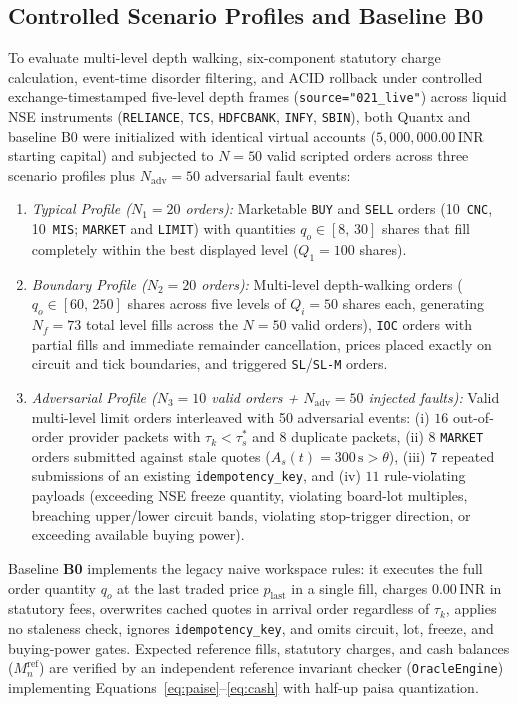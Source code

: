 \documentclass[12pt]{article}
\newcommand{\thinunit}[2]{#1\,\text{#2}}
\begin{document}
\subsection{Controlled Scenario Profiles and Baseline B0}
To evaluate multi-level depth walking, six-component statutory charge calculation, event-time disorder filtering, and ACID rollback under controlled exchange-timestamped five-level depth frames (\texttt{source="021\_live"}) across liquid NSE instruments (\texttt{RELIANCE}, \texttt{TCS}, \texttt{HDFCBANK}, \texttt{INFY}, \texttt{SBIN}), both Quantx and baseline B0 were initialized with identical virtual accounts ($\thinunit{5{,}000{,}000.00}{INR}$ starting capital) and subjected to $N=50$ valid scripted orders across three scenario profiles plus $N_{\mathrm{adv}}=50$ adversarial fault events:
\begin{enumerate}
  \item \emph{Typical Profile ($N_1=20$ orders):} Marketable \texttt{BUY} and \texttt{SELL} orders (10~\texttt{CNC}, 10~\texttt{MIS}; \texttt{MARKET} and \texttt{LIMIT}) with quantities $q_o \in [8,\,30]$ shares that fill completely within the best displayed level ($Q_1=100$ shares).
  \item \emph{Boundary Profile ($N_2=20$ orders):} Multi-level depth-walking orders ($q_o \in [60,\,250]$ shares across five levels of $Q_i=50$ shares each, generating $N_f=73$ total level fills across the $N=50$ valid orders), \texttt{IOC} orders with partial fills and immediate remainder cancellation, prices placed exactly on circuit and tick boundaries, and triggered \texttt{SL}/\texttt{SL-M} orders.
  \item \emph{Adversarial Profile ($N_3=10$ valid orders + $N_{\mathrm{adv}}=50$ injected faults):} Valid multi-level limit orders interleaved with 50 adversarial events: (i) $16$ out-of-order provider packets with $\tau_k < \tau^{*}_s$ and $8$ duplicate packets, (ii) $8$ \texttt{MARKET} orders submitted against stale quotes ($A_s(t) = \thinunit{300}{s} > \theta$), (iii) $7$ repeated submissions of an existing \texttt{idempotency\_key}, and (iv) $11$ rule-violating payloads (exceeding NSE freeze quantity, violating board-lot multiples, breaching upper/lower circuit bands, violating stop-trigger direction, or exceeding available buying power).
\end{enumerate}

Baseline \textbf{B0} implements the legacy naive workspace rules: it executes the full order quantity $q_o$ at the last traded price $p_{\mathrm{last}}$ in a single fill, charges $\thinunit{0.00}{INR}$ in statutory fees, overwrites cached quotes in arrival order regardless of $\tau_k$, applies no staleness check, ignores \texttt{idempotency\_key}, and omits circuit, lot, freeze, and buying-power gates. Expected reference fills, statutory charges, and cash balances ($M^{\mathrm{ref}}_n$) are verified by an independent reference invariant checker (\texttt{OracleEngine}) implementing Equations~\eqref{eq:paise}--\eqref{eq:cash} with half-up paisa quantization.
\end{document}
